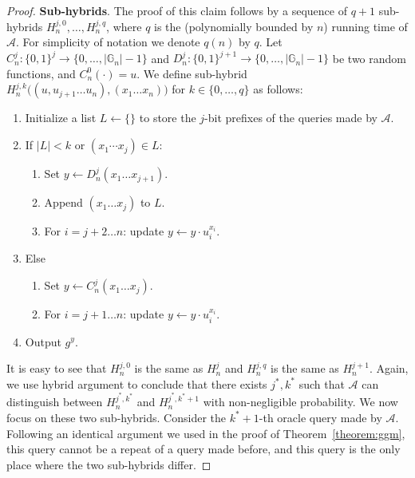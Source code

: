 \begin{proof}
    \noindent \textbf{Sub-hybrids}. The proof of this claim follows by a sequence of $q+1$ sub-hybrids $H_n^{j, 0}, \dots, H_n^{j, q}$, where $q$ is the (polynomially bounded by $n$) running time of $\mathcal{A}$. For simplicity of notation we denote $q(n)$ by $q$. Let $C_n^j: \{0, 1\}^j \to \{0, \dots, |\mathbb{G}_n|-1\}$ and $D_n^j: \{0, 1\}^{j+1} \to \{0, \dots, |\mathbb{G}_n|-1\}$ be two random functions, and $C_n^0(\cdot) = u$. We define sub-hybrid $H_n^{j, k}\big((u, u_{j+1}\ldots u_n),(x_1\dots x_n)\big)$ for $k \in \{0, \dots, q\}$ as follows:
    \begin{enumerate}
        \item Initialize a list $L \gets \{\}$ to store the $j$-bit prefixes of the queries made by $\mathcal{A}$.
        \item If $|L|<k$ or $(x_1\cdots x_j) \in L$:
              \begin{enumerate}
                  \item Set $y \gets D^j_n(x_1\dots x_{j+1})$.
                  \item Append $(x_1\dots x_j)$ to $L$.
                  \item For $i = j+2 \dots n$: update $y \gets y \cdot u_i^{x_i}$.
              \end{enumerate}
        \item Else
              \begin{enumerate}
                  \item Set $y \gets C^j_n(x_1\dots x_j)$.
                  \item For $i = j+1 \dots n$: update $y \gets y \cdot u_i^{x_i}$.
              \end{enumerate}
        \item Output $g^y$.
    \end{enumerate}

    It is easy to see that $H_n^{j, 0}$ is the same as $H_n^j$ and $H_n^{j, q}$ is the same as $H_n^{j+1}$.
    Again, we use hybrid argument to conclude that there exists $j^*, k^*$ such that $\mathcal{A}$ can distinguish between $H_n^{j^*, k^*}$ and $H_n^{j^*, k^*+1}$ with non-negligible probability. We now focus on these two sub-hybrids. Consider the $k^*+1$-th oracle query made by $\mathcal{A}$. Following an identical argument we used in the proof of Theorem~\ref{theorem:ggm}, this query cannot be a repeat of a query made before, and this query is the only place where the two sub-hybrids differ.\smallskip


\end{proof}
